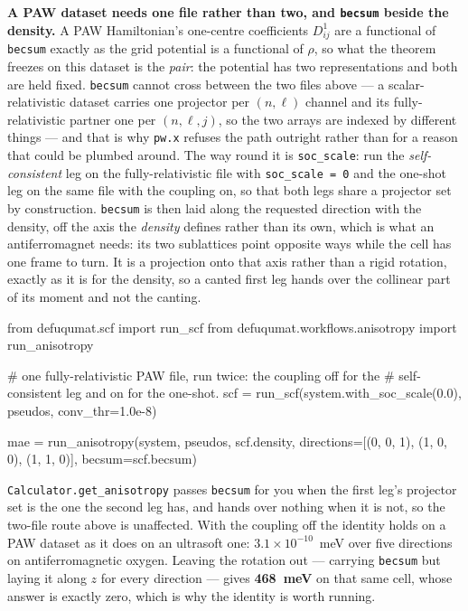 \documentclass[11pt,a4paper]{article}
\newcommand{\code}[1]{\texttt{\small #1}}
\begin{document}
\textbf{A PAW dataset needs one file rather than two, and \code{becsum} beside
the density.} A PAW Hamiltonian's one-centre coefficients $D^{1}_{ij}$ are a
functional of \code{becsum} exactly as the grid potential is a functional of
$\rho$, so what the theorem freezes on this dataset is the \emph{pair}: the
potential has two representations and both are held fixed. \code{becsum} cannot
cross between the two files above --- a scalar-relativistic dataset carries one
projector per $(n,\ell)$ channel and its fully-relativistic partner one per
$(n,\ell,j)$, so the two arrays are indexed by different things --- and that is
why \code{pw.x} refuses the path outright rather than for a reason that could be
plumbed around. The way round it is \code{soc\_scale}: run the
\emph{self-consistent} leg on the fully-relativistic file with
\code{soc\_scale = 0} and the one-shot leg on the same file with the coupling
on, so that both legs share a projector set by construction. \code{becsum} is
then laid along the requested direction with the density, off the axis the
\emph{density} defines rather than its own, which is what an antiferromagnet
needs: its two sublattices point opposite ways while the cell has one frame to
turn. It is a projection onto that axis rather than a rigid rotation, exactly as
it is for the density, so a canted first leg hands over the collinear part of
its moment and not the canting.

\begin{pycode}
from defuqumat.scf import run_scf
from defuqumat.workflows.anisotropy import run_anisotropy

# one fully-relativistic PAW file, run twice: the coupling off for the
# self-consistent leg and on for the one-shot.
scf = run_scf(system.with_soc_scale(0.0), pseudos, conv_thr=1.0e-8)

mae = run_anisotropy(system, pseudos, scf.density,
                     directions=[(0, 0, 1), (1, 0, 0), (1, 1, 0)],
                     becsum=scf.becsum)
\end{pycode}

\noindent \code{Calculator.get\_anisotropy} passes \code{becsum} for you when
the first leg's projector set is the one the second leg has, and hands over
nothing when it is not, so the two-file route above is unaffected. With the
coupling off the identity holds on a PAW dataset as it does on an ultrasoft
one: $3.1\times10^{-10}$~meV over five directions on antiferromagnetic oxygen.
Leaving the rotation out --- carrying \code{becsum} but laying it along $z$ for
every direction --- gives \textbf{468~meV} on that same cell, whose answer is
exactly zero, which is why the identity is worth running.
\end{document}
